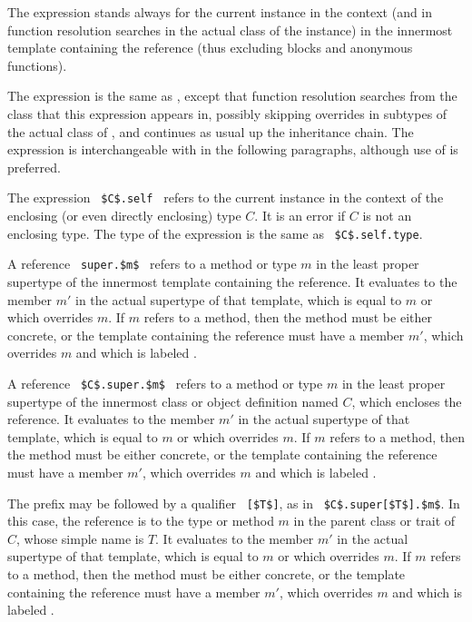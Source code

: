 The expression  stands always for the current instance in the context (and in function resolution searches in the actual class of the instance) in the innermost template containing the reference (thus excluding blocks and anonymous functions). 

The expression  is the same as , except that function resolution searches from the class that this expression appears in, possibly skipping overrides in subtypes of the actual class of , and continues as usual up the inheritance chain. The  expression is interchangeable with  in the following paragraphs, although use of  is preferred. 

The expression ~\lstinline!$C$.self!~ refers to the current instance in the context of the enclosing (or even directly enclosing) type $C$. It is an error if $C$ is not an enclosing type. The type of the expression is the same as ~\lstinline!$C$.self.type!. 

A reference ~\lstinline!super.$m$!~ refers to a method or type $m$ in the least proper supertype of the innermost template containing the reference. It evaluates to the member $m'$ in the actual supertype of that template, which is equal to $m$ or which overrides $m$. If $m$ refers to a method, then the method must be either concrete, or the template containing the reference must have a member $m'$, which overrides $m$ and which is labeled . 

A reference ~\lstinline!$C$.super.$m$!~ refers to a method or type $m$ in the least proper supertype of the innermost class or object definition named $C$, which encloses the reference. It evaluates to the member $m'$ in the actual supertype of that template, which is equal to $m$ or which overrides $m$. If $m$ refers to a method, then the method must be either concrete, or the template containing the reference must have a member $m'$, which overrides $m$ and which is labeled . 

The  prefix may be followed by a qualifier ~\lstinline![$T$]!, as in ~\lstinline!$C$.super[$T$].$m$!. In this case, the reference is to the type or method $m$ in the parent class or trait of $C$, whose simple name is $T$. It evaluates to the member $m'$ in the actual supertype of that template, which is equal to $m$ or which overrides $m$. If $m$ refers to a method, then the method must be either concrete, or the template containing the reference must have a member $m'$, which overrides $m$ and which is labeled . 

